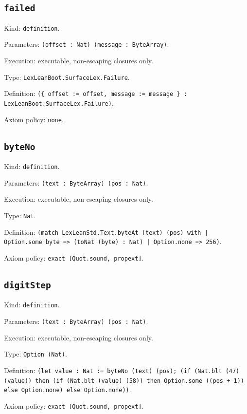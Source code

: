 \documentclass[11pt]{article}
\begin{document}
\subsection*{\texttt{failed}}
\noindent Kind: \texttt{definition}.\par
\noindent Parameters: \texttt{(offset : Nat) (message : ByteArray)}.\par
\noindent Execution: executable, non-escaping closures only.\par
\noindent Type: \texttt{LexLeanBoot.SurfaceLex.Failure}.\par
\noindent Definition: \texttt{(\{ offset := offset, message := message \} : LexLeanBoot.SurfaceLex.Failure)}.\par
\noindent Axiom policy: \texttt{none}.\par
\subsection*{\texttt{byteNo}}
\noindent Kind: \texttt{definition}.\par
\noindent Parameters: \texttt{(text : ByteArray) (pos : Nat)}.\par
\noindent Execution: executable, non-escaping closures only.\par
\noindent Type: \texttt{Nat}.\par
\noindent Definition: \texttt{(match LexLeanStd.Text.byteAt (text) (pos) with | Option.some byte => (toNat (byte) : Nat) | Option.none => 256)}.\par
\noindent Axiom policy: \texttt{exact [Quot.sound, propext]}.\par
\subsection*{\texttt{digitStep}}
\noindent Kind: \texttt{definition}.\par
\noindent Parameters: \texttt{(text : ByteArray) (pos : Nat)}.\par
\noindent Execution: executable, non-escaping closures only.\par
\noindent Type: \texttt{Option (Nat)}.\par
\noindent Definition: \texttt{(let value : Nat := byteNo (text) (pos); (if (Nat.blt (47) (value)) then (if (Nat.blt (value) (58)) then Option.some ((pos + 1)) else Option.none) else Option.none))}.\par
\noindent Axiom policy: \texttt{exact [Quot.sound, propext]}.\par
\end{document}
